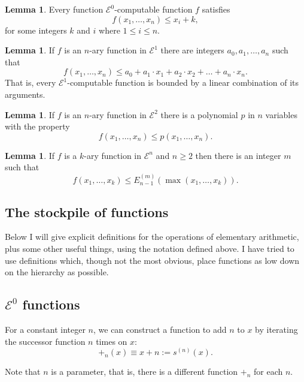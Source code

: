 \documentclass[a4paper]{article}
\newcommand{\grz}[1]{$\mathcal{E}^{#1}$}	%
\theoremstyle{plain}
\theoremstyle{definition}
\newtheorem{lemma}[theorem]{Lemma}
\begin{document}
\begin{lemma} \cite[Lemma 2.2.5]{Rose_1984}
	Every function \grz{0}-computable function $f$ satisfies
	\[ f(x_1, \dots, x_n) \leq x_i + k, \]
	for some integers $k$ and $i$ where $1 \leq i \leq n$.
\end{lemma}

\begin{lemma} \cite[Lemma 2.2.6]{Rose_1984}
	If $f$ is an $n$-ary function in \grz{1} there are integers $a_0,a_1, \dots,a_n$ such that
	\[f(x_1,\dots,x_n) \leq a_0 + a_1 \cdot x_1 + a_2 \cdot x_2 + \dots + a_n \cdot x_n. \]
	That is, every \grz{1}-computable function is bounded by a linear combination of its arguments.
\end{lemma}

\begin{lemma} \cite[Lemma 2.2.7]{Rose_1984}
	If $f$ is an $n$-ary function in \grz{2} there is a polynomial $p$ in $n$ variables with the property
	\[f(x_1, \dots,x_n) \leq p(x_1, \dots, x_n). \]
\end{lemma}

\begin{lemma} \cite[Lemma 2.2.9]{Rose_1984}
	If $f$ is a $k$-ary function in \grz{n} and $n \geq 2$ then there is an integer $m$ such that
	\[f(x_1, \dots, x_k) \leq E_{n-1}^{(m)}(\max(x_1, \dots, x_k)).\]
\end{lemma}

\subsection{The stockpile of functions}
Below I will give explicit definitions for the operations of elementary arithmetic, plus some other useful things, using the notation defined above. I have tried to use definitions which, though not the most obvious, place functions as low down on the hierarchy as possible.

\subsection{\grz{0} functions}
For a constant integer $n$, we can construct a function to add $n$ to $x$ by iterating the successor function $n$ times on $x$:
\begin{equation} +_n(x) \equiv x + n := s^{(n)}(x). \end{equation}

Note that $n$ is a parameter, that is, there is a different function $+_n$ for each $n$.
\end{document}
